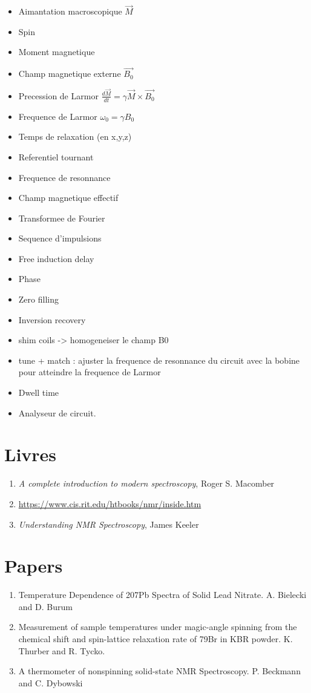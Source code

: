 \documentclass{article}
\begin{document}
\begin{itemize}
    \item Aimantation macroscopique $\Vec{M}$
    \item Spin
    \item Moment magnetique
    \item Champ magnetique externe $\Vec{B_0}$
    \item Precession de Larmor $\frac{d \Vec{M}}{dt} = \gamma \Vec{M} \times \Vec{B_0}$
    \item Frequence de Larmor $\omega_0 = \gamma B_0$
    \item Temps de relaxation (en x,y,z)
    \item Referentiel tournant
    \item Frequence de resonnance
    \item Champ magnetique effectif
    \item Transformee de Fourier
    \item Sequence d'impulsions
    \item Free induction delay
    \item Phase
    \item Zero filling
    \item Inversion recovery 
    \item shim coils -> homogeneiser le champ B0
    \item tune + match : ajuster la frequence de resonnance du circuit avec la bobine pour atteindre la frequence de Larmor
    \item Dwell time
\item Analyseur de circuit.
\end{itemize}


\section{Livres}

\begin{enumerate}
    \item \textit{A complete introduction to modern spectroscopy}, Roger S. Macomber
    \item \url{https://www.cis.rit.edu/htbooks/nmr/inside.htm}
    \item \textit{Understanding NMR Spectroscopy}, James Keeler
\end{enumerate}
\section{Papers}
\begin{enumerate}
    \item Temperature Dependence of 207Pb Spectra of Solid Lead Nitrate. A. Bielecki and D. Burum
    \item Measurement of sample temperatures under magic-angle spinning from the chemical shift and spin-lattice relaxation rate of 79Br in KBR powder. K. Thurber and R. Tycko.
    \item A thermometer of nonspinning solid-state NMR Spectroscopy. P. Beckmann and C. Dybowski
\end{enumerate}
\end{document}
